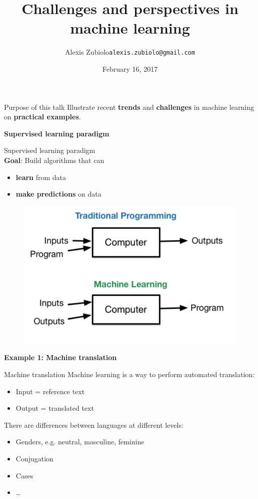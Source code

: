 \documentclass{beamer}
\title[Course presentation]{Challenges and perspectives in machine learning}
\author{Alexis Zubiolo\newline\texttt{alexis.zubiolo@gmail.com}}
\institute{Data Science Team Lead @ Adcash}
\date{February 16, 2017}
\begin{document}
\begin{frame}
  \titlepage
\end{frame}

\begin{frame}{Purpose of this talk}
Illustrate recent \textbf{trends} and \textbf{challenges} in machine learning on \textbf{practical examples}.
\end{frame}

\begin{frame}
\center
\Huge
\textbf{Supervised learning paradigm}
\end{frame}

\begin{frame}{Supervised learning paradigm}
~\\
\textbf{Goal}: Build algorithms that can 
\begin{itemize}
	\item \textbf{learn} from data
	\item \textbf{make predictions} on data
\end{itemize}
\vfill
\begin{figure}
\centering
\includegraphics[width=\textwidth]{images/ml_vs_traditional.png}
\end{figure}
\end{frame}

\begin{frame}
\center
\Huge
\textbf{Example 1: Machine translation}
\end{frame}

\begin{frame}{Machine translation}
Machine learning is a way to perform automated translation:
\begin{itemize}
	\item Input = reference text
	\item Output = translated text
\end{itemize}
\pause
\vfill
There are differences between languages at different levels:
\begin{itemize}
	\item Genders, e.g. neutral, masculine, feminine
	\item Conjugation
	\item Cases
	\item \dots
\end{itemize}
\end{frame}
\end{document}
